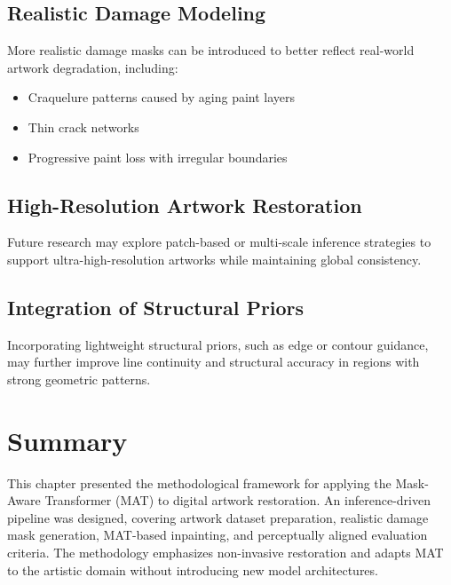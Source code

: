 \documentclass[12pt, twoside]{report}
\begin{document}
\subsection{Realistic Damage Modeling}

More realistic damage masks can be introduced to better reflect real-world artwork degradation, including:
\begin{itemize}
    \item Craquelure patterns caused by aging paint layers
    \item Thin crack networks
    \item Progressive paint loss with irregular boundaries
\end{itemize}

\subsection{High-Resolution Artwork Restoration}

Future research may explore patch-based or multi-scale inference strategies to support ultra-high-resolution artworks while maintaining global consistency.

\subsection{Integration of Structural Priors}

Incorporating lightweight structural priors, such as edge or contour guidance, may further improve line continuity and structural accuracy in regions with strong geometric patterns.

\section{Summary}

This chapter presented the methodological framework for applying the Mask-Aware Transformer (MAT) to digital artwork restoration. An inference-driven pipeline was designed, covering artwork dataset preparation, realistic damage mask generation, MAT-based inpainting, and perceptually aligned evaluation criteria. The methodology emphasizes non-invasive restoration and adapts MAT to the artistic domain without introducing new model architectures.

\fi

\nocite{*}


\end{document}
